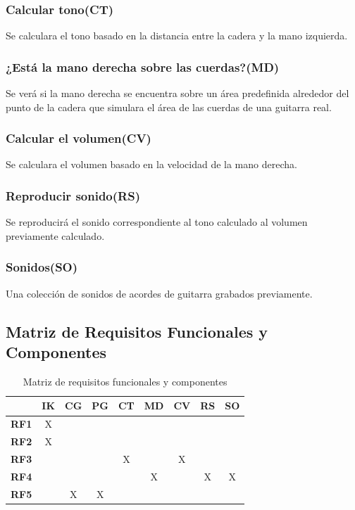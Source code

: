\documentclass[a4paper,12pt]{article}
\begin{document}
\subsubsection{Calcular tono(CT)}
Se calculara el tono basado en la distancia entre la cadera y la mano izquierda.
\subsubsection{¿Está la mano derecha sobre las cuerdas?(MD)}
Se verá si la mano derecha se encuentra sobre un área predefinida alrededor del
punto de la cadera que simulara el área de las cuerdas de una guitarra real.
\subsubsection{Calcular el volumen(CV)}
Se calculara el volumen basado en la velocidad de la mano derecha.
\subsubsection{Reproducir sonido(RS)}
Se reproducirá el sonido correspondiente al tono calculado al volumen
previamente calculado.
\subsubsection{Sonidos(SO)}
Una colección de sonidos de acordes de guitarra grabados previamente.
\subsection{Matriz de Requisitos Funcionales y Componentes}
\begin{table}[h!]
        \centering
        \begin{tabular}{|c|c|c|c|c|c|c|c|c|}
                \hline
                 & \textbf{IK} & \textbf{CG} & \textbf{PG} & \textbf{CT} &
                 \textbf{MD} & \textbf{CV} & \textbf{RS} & \textbf{SO} \\
                \hline
                \textbf{RF1} & X & & & & & & & \\
                \hline
                \textbf{RF2} & X & & & & & & & \\
                \hline
                \textbf{RF3} & & & & X & & X & & \\
                \hline
                \textbf{RF4} & & & & & X & & X & X \\
                \hline
                \textbf{RF5} & & X & X & & & & & \\
                \hline
        \end{tabular}
        \caption{Matriz de requisitos funcionales y componentes}
        \label{tab:matrizrequisitos}
\end{table}
\end{document}
